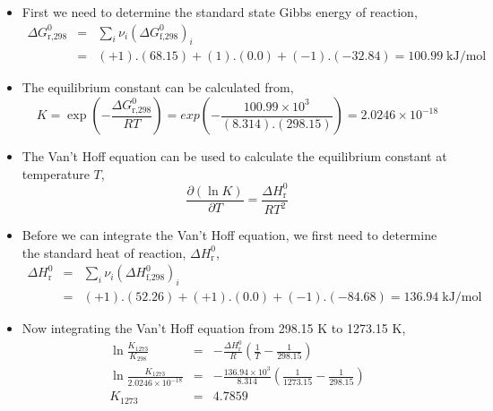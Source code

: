 \documentclass[12pts,a4paper,amsmath,amssymb,floatfix]{article}%
\newcommand{\frc}{\displaystyle\frac}
\newcounter{reaction}
\begin{document}
\begin{enumerate}[1)]
   \begin{itemize}
      \item First we need to determine the standard state Gibbs energy of reaction,
         \begin{eqnarray}
             \Delta G^{0}_{\text{r,298}} &=& \sum\limits_{i}\nu_{i}\left(\Delta G^{0}_{\text{f,298}}\right)_{i} \nonumber \\
                                     &=& (+1).(68.15)+ (1).(0.0) + (-1).(-32.84) = 100.99\; \text{kJ/mol} \nonumber
         \end{eqnarray}
      \item The equilibrium constant can be calculated from,
         \begin{displaymath}
            K = \exp\left(-\frc{\Delta G^{0}_{\text{r,298}}}{RT}\right) = exp\left(-\frc{100.99\times 10^{3}}{(8.314).(298.15)}\right) = 2.0246\times 10^{-18}
         \end{displaymath}
      \item The Van't Hoff equation can be used to calculate the equilibrium constant at temperature $T$,
         \begin{displaymath}
            \frc{\partial\left(\ln K\right)}{\partial T} = \frc{\Delta H^{0}_{\text{r}}}{RT^{2}}
         \end{displaymath}
      \item Before we can integrate the Van't Hoff equation, we first need to determine the standard heat of reaction, $\Delta H^{0}_{\text{r}}$,
         \begin{eqnarray}
            \Delta H^{0}_{\text{r}} &=& \sum\limits_{i} \nu_{i}\left(\Delta H^{0}_{\text{f,298}}\right)_{i} \nonumber \\
                                 &=& (+1).(52.26) + (+1).(0.0) + (-1).(-84.68) = 136.94\;\text{kJ/mol}\nonumber
         \end{eqnarray}
      \item Now integrating the Van't Hoff equation from 298.15 K to 1273.15 K,
         \begin{eqnarray}
            \ln\frc{K_{1273}}{K_{298}} &=& -\frc{\Delta H^{0}_{\text{r}}}{R}\left(\frc{1}{T}-\frc{1}{298.15}\right) \nonumber \\
            \ln\frc{K_{1273}}{2.0246\times 10^{-18}} &=& -\frc{136.94\times 10^{3}}{8.314}\left(\frc{1}{1273.15}-\frc{1}{298.15}\right) \nonumber \\
            K_{1273} &=& 4.7859 \nonumber
         \end{eqnarray} 

\end{itemize}
\end{enumerate}
\end{document}
